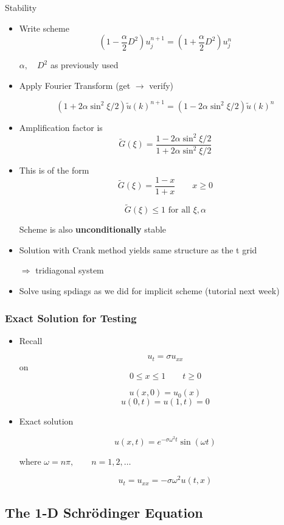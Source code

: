 Stability
\begin{itemize}
    \item Write scheme
    \[(1- \frac{\alpha}{2} D^2 ) u_j^{n+1} = (1+\frac{\alpha }{2} D^2) u_j^n\]

    $\alpha, \quad D^2$ as previously used
    \item Apply Fourier Transform (get $\rightarrow$ verify)
    
    \[(1+2\alpha \sin^2 \xi/2 ) \tilde{u}(k)^{n+1} = (1-2\alpha \sin^2\xi/2 ) \tilde{u}(k)^n\]
    
    \item Amplification factor is
    \[ \tilde{G}(\xi) = \frac{1-2\alpha \sin^2 \xi/2}{1+2\alpha \sin^2 \xi/2} \]
    \item This is of the form
    \[ \tilde{G}(\xi) = \frac{1-x}{1+x} \qquad x \ge 0 \]

    \[ \tilde{G}(\xi) \le 1 \text{ for all } \xi, \alpha \]

    Scheme is also \textbf{unconditionally} stable

    \item Solution with Crank method yields same structure as the t grid 

    $\Rightarrow$ tridiagonal system

    \item Solve using spdiags as we did for implicit scheme (tutorial next week)
\end{itemize}

\subsubsection{Exact Solution for Testing}

\begin{itemize}
    \item Recall 

    \[ u_t = \sigma u_{xx}\]
    on
    \[ 0 \le x \le 1 \qquad t\ge 0\]

    \[ u(x,0) = u_0(x)\]
    \[u(0,t) = u(1,t) = 0\]

    \item Exact solution

    \[ u(x,t) = e^{-\sigma \omega ^2 t} \sin(\omega t) \]

    where $\omega = n \pi , \qquad n=1,2, \ldots$

    \[ u_t = u_{xx} = -\sigma \omega^2 u(t,x)\]
\end{itemize}


\subsection{The 1-D Schr\"{o}dinger Equation}

